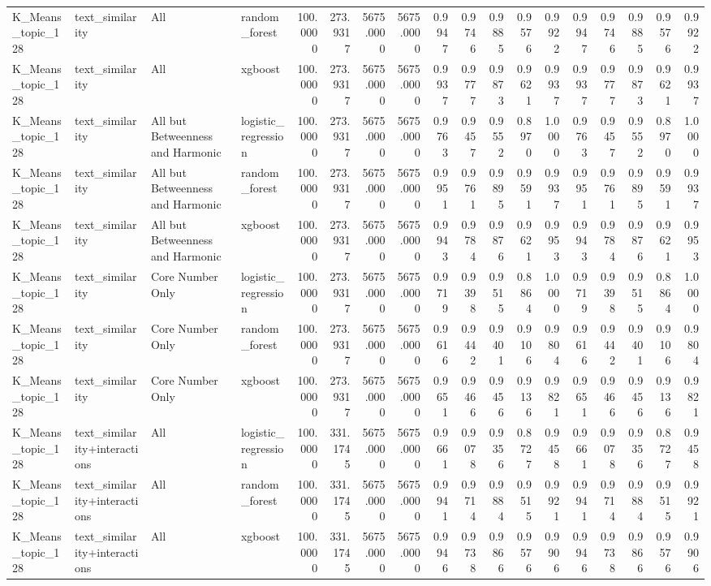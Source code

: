 \begin{tabular}{llllrrrrrrrrrrrrrr}
K_Means_topic_128 & text_similarity & All & random_forest & 100.0000 & 273.9317 & 5675.0000 & 5675.0000 & 0.9947 & 0.9746 & 0.9885 & 0.9576 & 0.9922 & 0.9947 & 0.9746 & 0.9885 & 0.9576 & 0.9922 \\
K_Means_topic_128 & text_similarity & All & xgboost & 100.0000 & 273.9317 & 5675.0000 & 5675.0000 & 0.9937 & 0.9777 & 0.9873 & 0.9621 & 0.9937 & 0.9937 & 0.9777 & 0.9873 & 0.9621 & 0.9937 \\
K_Means_topic_128 & text_similarity & All but Betweenness and Harmonic & logistic_regression & 100.0000 & 273.9317 & 5675.0000 & 5675.0000 & 0.9763 & 0.9457 & 0.9552 & 0.8970 & 1.0000 & 0.9763 & 0.9457 & 0.9552 & 0.8970 & 1.0000 \\
K_Means_topic_128 & text_similarity & All but Betweenness and Harmonic & random_forest & 100.0000 & 273.9317 & 5675.0000 & 5675.0000 & 0.9951 & 0.9761 & 0.9895 & 0.9591 & 0.9937 & 0.9951 & 0.9761 & 0.9895 & 0.9591 & 0.9937 \\
K_Means_topic_128 & text_similarity & All but Betweenness and Harmonic & xgboost & 100.0000 & 273.9317 & 5675.0000 & 5675.0000 & 0.9943 & 0.9784 & 0.9876 & 0.9621 & 0.9953 & 0.9943 & 0.9784 & 0.9876 & 0.9621 & 0.9953 \\
K_Means_topic_128 & text_similarity & Core Number Only & logistic_regression & 100.0000 & 273.9317 & 5675.0000 & 5675.0000 & 0.9719 & 0.9398 & 0.9515 & 0.8864 & 1.0000 & 0.9719 & 0.9398 & 0.9515 & 0.8864 & 1.0000 \\
K_Means_topic_128 & text_similarity & Core Number Only & random_forest & 100.0000 & 273.9317 & 5675.0000 & 5675.0000 & 0.9616 & 0.9442 & 0.9401 & 0.9106 & 0.9804 & 0.9616 & 0.9442 & 0.9401 & 0.9106 & 0.9804 \\
K_Means_topic_128 & text_similarity & Core Number Only & xgboost & 100.0000 & 273.9317 & 5675.0000 & 5675.0000 & 0.9651 & 0.9466 & 0.9456 & 0.9136 & 0.9821 & 0.9651 & 0.9466 & 0.9456 & 0.9136 & 0.9821 \\
K_Means_topic_128 & text_similarity+interactions & All & logistic_regression & 100.0000 & 331.1745 & 5675.0000 & 5675.0000 & 0.9661 & 0.9078 & 0.9356 & 0.8727 & 0.9458 & 0.9661 & 0.9078 & 0.9356 & 0.8727 & 0.9458 \\
K_Means_topic_128 & text_similarity+interactions & All & random_forest & 100.0000 & 331.1745 & 5675.0000 & 5675.0000 & 0.9941 & 0.9714 & 0.9884 & 0.9515 & 0.9921 & 0.9941 & 0.9714 & 0.9884 & 0.9515 & 0.9921 \\
K_Means_topic_128 & text_similarity+interactions & All & xgboost & 100.0000 & 331.1745 & 5675.0000 & 5675.0000 & 0.9946 & 0.9738 & 0.9866 & 0.9576 & 0.9906 & 0.9946 & 0.9738 & 0.9866 & 0.9576 & 0.9906 \\

\end{tabular}
